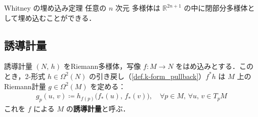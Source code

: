 \documentclass[geometry_main]{subfiles}
\begin{document}


	

\begin{mytheo}[label=thm.Whitney]{Whitney の埋め込み定理}
	任意の $n$ 次元 \cinfty 多様体は $\mathbb{R}^{2n+1}$ の中に閉部分多様体として埋め込むことができる．
\end{mytheo}

\subsection{誘導計量}

\begin{mydef}[label=def.induced_metric]{誘導計量}
	$(N,\, h)$ をRiemann多様体，\cinfty 写像 $f \colon M \to N$ をはめ込みとする．このとき，2-形式 $h \in \Omega^2(N)$ の引き戻し（\ref{def.k-form_pullback}）$f^*h$ は $M$ 上のRiemann計量 $g \in \Omega^2(M)$ を定める：
	\begin{align}
		g_p (u,\, v) \coloneqq h_{f(p)} \bigl(f_*(u),\, f_*(v)\bigr), \quad \forall p \in M,\, \forall u,\, v \in T_p M
	\end{align}
	これを $f$ による $M$ の\textbf{誘導計量}と呼ぶ．
\end{mydef}
\end{document}
